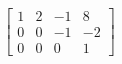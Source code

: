 \documentclass[preview]{standalone}
\begin{document}
\begin{align*}
\left[\begin{array}{ccc|c} 1 & 2 & -1 & 8 \\ 0 & 0 & -1 & -2 \\ 0 & 0 & 0 & 1 \end{array}\right]
\end{align*}
\end{document}
